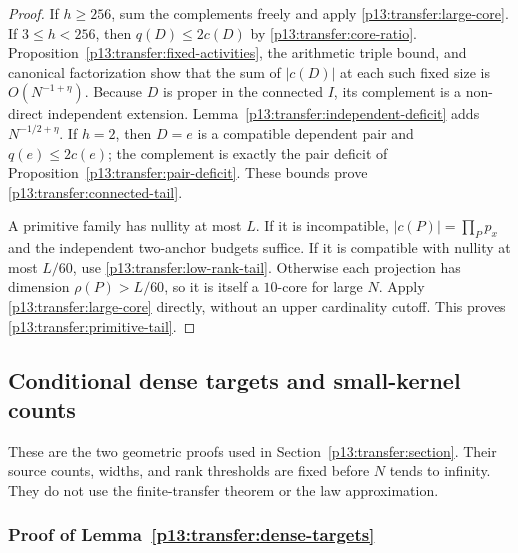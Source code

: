 \begin{proof}
If $h\geq256$, sum the complements freely and apply
\eqref{p13:transfer:large-core}. If $3\leq h<256$, then
$q(D)\leq2c(D)$ by \eqref{p13:transfer:core-ratio}.
Proposition~\ref{p13:transfer:fixed-activities}, the arithmetic triple
bound, and canonical factorization show that the sum of $|c(D)|$ at
each such fixed size is $O(N^{-1+\eta})$. Because $D$ is proper in
the connected $I$, its complement is a non-direct independent extension.
Lemma~\ref{p13:transfer:independent-deficit} adds $N^{-1/2+\eta}$.
If $h=2$, then $D=e$ is a compatible dependent pair and $q(e)\leq2c(e)$;
the complement is exactly the pair deficit of
Proposition~\ref{p13:transfer:pair-deficit}. These bounds prove
\eqref{p13:transfer:connected-tail}.

A primitive family has nullity at most $L$. If it is incompatible,
$|c(P)|=\prod_Pp_x$ and the independent two-anchor budgets suffice.
If it is compatible with nullity at most $L/60$, use
\eqref{p13:transfer:low-rank-tail}. Otherwise each projection has
dimension $\rho(P)>L/60$, so it is itself a $10$-core for large $N$.
Apply \eqref{p13:transfer:large-core} directly, without an upper
cardinality cutoff. This proves \eqref{p13:transfer:primitive-tail}.
\end{proof}


\subsection{Conditional dense targets and small-kernel counts}
\label{p14:comp:transfer}

These are the two geometric proofs used in
Section~\ref{p13:transfer:section}. Their source counts, widths, and rank
thresholds are fixed before $N$ tends to infinity. They do not use the
finite-transfer theorem or the law approximation.

\subsubsection{Proof of Lemma~\ref{p13:transfer:dense-targets}}
\label{p14:comp:transfer-dense-targets}

